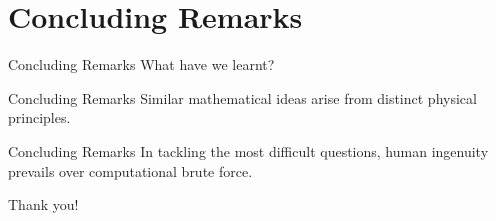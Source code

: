 \documentclass{beamer}
\begin{document}
\section{Concluding Remarks}


\begin{frame}{Concluding Remarks}
    What have we learnt?
\end{frame}


\begin{frame}{Concluding Remarks}
    Similar mathematical ideas arise from distinct physical principles.
\end{frame}


\begin{frame}{Concluding Remarks}
    In tackling the most difficult questions, human ingenuity prevails over computational brute force.
\end{frame}


\begin{frame}{}
    \begin{center}
        {\Huge Thank you!}
    \end{center}
\end{frame}
\end{document}
